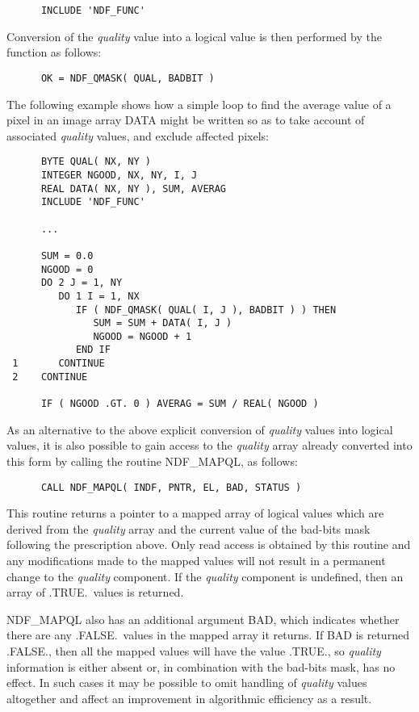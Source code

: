 \documentclass[twoside,11pt]{article}
\newcommand{\htmlref}[2]{#1}
\newcommand{\st}[1]{{\em{#1}}}
\begin{document}
\small
\begin{verbatim}
      INCLUDE 'NDF_FUNC'
\end{verbatim}
\normalsize

Conversion of the \st{quality\/} value into a logical value is then performed by 
the function as follows:

\small
\begin{verbatim}
      OK = NDF_QMASK( QUAL, BADBIT )
\end{verbatim}
\normalsize

The following example shows how a simple loop to find the average value of
a pixel in an image array DATA might be written so as to take account of
associated \st{quality\/} values, and exclude affected pixels: 

\small
\begin{verbatim}
      BYTE QUAL( NX, NY )
      INTEGER NGOOD, NX, NY, I, J
      REAL DATA( NX, NY ), SUM, AVERAG
      INCLUDE 'NDF_FUNC'

      ...

      SUM = 0.0
      NGOOD = 0
      DO 2 J = 1, NY
         DO 1 I = 1, NX
            IF ( NDF_QMASK( QUAL( I, J ), BADBIT ) ) THEN
               SUM = SUM + DATA( I, J )
               NGOOD = NGOOD + 1
            END IF
 1       CONTINUE
 2    CONTINUE

      IF ( NGOOD .GT. 0 ) AVERAG = SUM / REAL( NGOOD )
\end{verbatim}      
\normalsize

As an alternative to the above explicit conversion of \st{quality\/} values into 
logical values, it is also possible to gain access to the \st{quality\/} array 
already converted into this form by calling the routine \htmlref{NDF\_MAPQL}{NDF_MAPQL}, as 
follows:

\small
\begin{verbatim}
      CALL NDF_MAPQL( INDF, PNTR, EL, BAD, STATUS )
\end{verbatim}
\normalsize

This routine returns a pointer to a mapped array of logical values which are 
derived from the \st{quality\/} array and the current value of the bad-bits mask 
following the prescription above.
Only read access is obtained by this routine and any modifications made to 
the mapped values will not result in a permanent change to the \st{quality\/}
component.
If the \st{quality\/} component is undefined, then an array of .TRUE.\ values is
returned. 

NDF\_MAPQL also has an additional argument BAD, which indicates whether 
there are any .FALSE.\ values in the mapped array it returns.
If BAD is returned .FALSE., then all the mapped values will have the value 
.TRUE., so \st{quality\/} information is either absent or, in combination with
the bad-bits mask, has no effect.
In such cases it may be possible to omit handling of \st{quality\/} values 
altogether and affect an improvement in algorithmic efficiency as a result.
\end{document}
